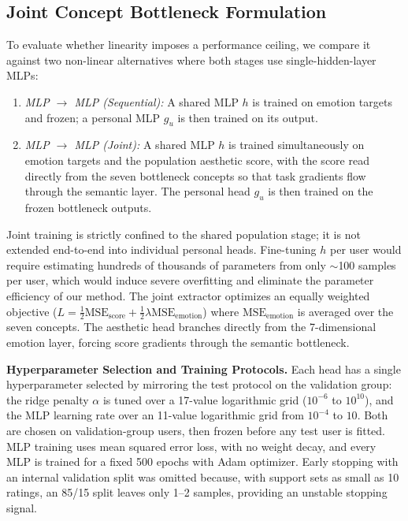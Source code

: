 \subsection{Joint Concept Bottleneck Formulation}
\label{sec:supp_joint}
To evaluate whether linearity imposes a performance ceiling, we compare it against two non-linear alternatives where both stages use single-hidden-layer MLPs:
\begin{enumerate}[noitemsep,topsep=2pt]
    \item \emph{MLP $\to$ MLP (Sequential):} A shared MLP $h$ is trained on emotion targets and frozen; a personal MLP $g_u$ is then trained on its output.
    \item \emph{MLP $\to$ MLP (Joint):} A shared MLP $h$ is trained simultaneously on emotion targets and the population aesthetic score, with the score read directly from the seven bottleneck concepts so that task gradients flow through the semantic layer. The personal head $g_u$ is then trained on the frozen bottleneck outputs.
\end{enumerate}
Joint training is strictly confined to the shared population stage; it is not extended end-to-end into individual personal heads. Fine-tuning $h$ per user would require estimating hundreds of thousands of parameters from only $\sim$100 samples per user, which would induce severe overfitting and eliminate the parameter efficiency of our method.
The joint extractor optimizes an equally weighted objective ($L = \frac{1}{2}\text{MSE}_{\text{score}} + \frac{1}{2}\lambda\text{MSE}_{\text{emotion}}$) where $\text{MSE}_{\text{emotion}}$ is averaged over the seven concepts. The aesthetic head branches directly from the 7-dimensional emotion layer, forcing score gradients through the semantic bottleneck.

\textbf{Hyperparameter Selection and Training Protocols.}
Each head has a single hyperparameter selected by mirroring the test protocol on the validation group: the ridge penalty $\alpha$ is tuned over a 17-value logarithmic grid ($10^{-6}$ to $10^{10}$), and the MLP learning rate over an 11-value logarithmic grid from $10^{-4}$ to $10$. Both are chosen on validation-group users, then frozen before any test user is fitted. 
MLP training uses mean squared error loss, with no weight decay, and every MLP is trained for a fixed 500 epochs with Adam optimizer. Early stopping with an internal validation split was omitted because, with support sets as small as 10 ratings, an 85/15 split leaves only 1--2 samples, providing an unstable stopping signal.

